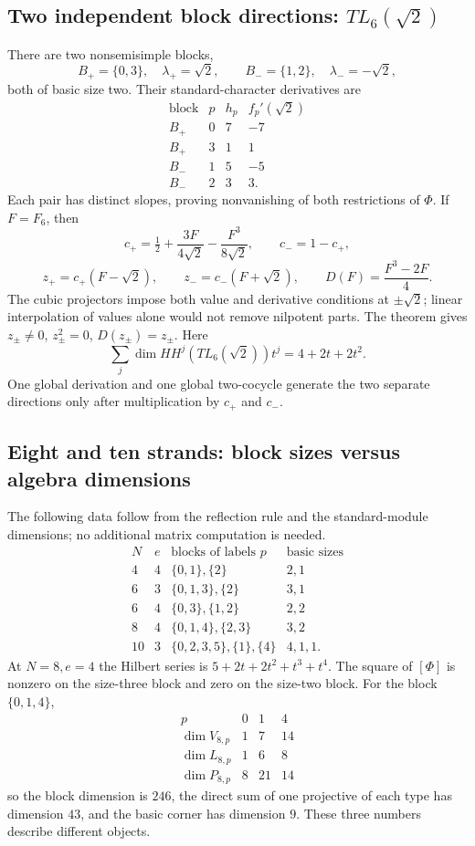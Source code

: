 \documentclass[a4paper,11pt,oneside,reqno]{amsart}
\theoremstyle{definition}
\numberwithin{equation}{section}
\begin{document}
	\subsection{Two independent block directions: \texorpdfstring{$TL_6(\sqrt2)$}{TL6(sqrt2)}}
	There are two nonsemisimple blocks,
	\[
	B_+=\{0,3\},\quad\lambda_+=\sqrt2,
	\qquad B_-=\{1,2\},\quad\lambda_-=-\sqrt2,
	\]
	both of basic size two.  Their standard-character derivatives are
	\[
	\begin{array}{c|c|c|c}
		\text{block}&p&h_p&f_p'(\sqrt2)\\\hline
		B_+&0&7&-7\\B_+&3&1&1\\
		B_-&1&5&-5\\B_-&2&3&3.
	\end{array}
	\]
	Each pair has distinct slopes, proving nonvanishing of both
	restrictions of $\Phi$.  If $F=F_6$, then
	\[
	c_+=\tfrac12+\frac{3F}{4\sqrt2}-\frac{F^3}{8\sqrt2},\qquad
	c_-=1-c_+,
	\]
	\[
	z_+=c_+(F-\sqrt2),\qquad z_-=c_-(F+\sqrt2),\qquad
	D(F)=\frac{F^3-2F}{4}.
	\]
	The cubic projectors impose both value and derivative conditions at
	$\pm\sqrt2$; linear interpolation of values alone would not remove
	nilpotent parts.  The theorem gives $z_\pm\ne0$, $z_\pm^2=0$,
	$D(z_\pm)=z_\pm$.  Here
	\[
	\sum_j\dim HH^j(TL_6(\sqrt2))t^j=4+2t+2t^2.
	\]
	One global derivation and one global two-cocycle generate the two
	separate directions only after multiplication by $c_+$ and $c_-$.
	
	\subsection{Eight and ten strands: block sizes versus algebra dimensions}
	The following data follow from the reflection rule and
	the standard-module dimensions; no additional matrix computation is needed.
	\[
	\begin{array}{c|c|c|c}
		N&e&\text{blocks of labels }p&\text{basic sizes}\\\hline
		4&4&\{0,1\},\{2\}&2,1\\
		6&3&\{0,1,3\},\{2\}&3,1\\
		6&4&\{0,3\},\{1,2\}&2,2\\
		8&4&\{0,1,4\},\{2,3\}&3,2\\
		10&3&\{0,2,3,5\},\{1\},\{4\}&4,1,1.
	\end{array}
	\]
	At $N=8,e=4$ the Hilbert series is
	$5+2t+2t^2+t^3+t^4$.  The square of $[\Phi]$ is nonzero on the
	size-three block and zero on the size-two block.
	For the block $\{0,1,4\}$,
	\[
	\begin{array}{c|ccc}
		p&0&1&4\\\hline
		\dim V_{8,p}&1&7&14\\
		\dim L_{8,p}&1&6&8\\
		\dim P_{8,p}&8&21&14
	\end{array}
	\]
	so the block dimension is $246$, the direct sum of one projective of
	each type has dimension $43$, and the basic corner has dimension $9$.
	These three numbers describe different objects.
	
\end{document}
